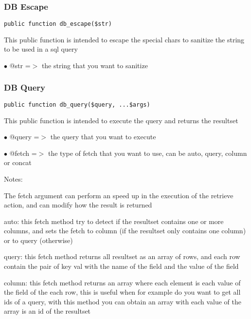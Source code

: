 \documentclass[a4paper]{article}
\begin{document}
\hypertarget{toc323}{}
\subsubsection{DB Escape}

\begin{lstlisting}
public function db_escape($str)
\end{lstlisting}

This public function is intended to escape the special chars to sanitize the string to be used
in a sql query

\begin{compactitem}
\item[\color{myblue}$\bullet$] @str =$>$ the string that you want to sanitize
\end{compactitem}

\hypertarget{toc324}{}
\subsubsection{DB Query}

\begin{lstlisting}
public function db_query($query, ...$args)
\end{lstlisting}

This public function is intended to execute the query and returns the resultset

\begin{compactitem}
\item[\color{myblue}$\bullet$] @query =$>$ the query that you want to execute
\item[\color{myblue}$\bullet$] @fetch =$>$ the type of fetch that you want to use, can be auto, query, column or concat
\end{compactitem}

Notes:

The fetch argument can perform an speed up in the execution of the retrieve action, and
can modify how the result is returned

auto: this fetch method try to detect if the resultset contains one or more columns, and
sets the fetch to column (if the resultset only contains one column) or to query (otherwise)

query: this fetch method returns all resultset as an array of rows, and each row contain the
pair of key val with the name of the field and the value of the field

column: this fetch method returns an array where each element is each value of the field of
the each row, this is useful when for example do you want to get all ids of a query, with
this method you can obtain an array with each value of the array is an id of the resultset
\end{document}
